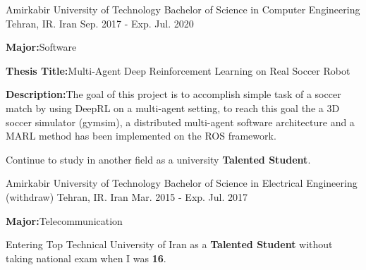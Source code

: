 

\begin{cventries}

  \cventry
    {Amirkabir University of Technology} %
    {Bachelor of Science in Computer Engineering} %
    {Tehran, IR. Iran} %
    {Sep. 2017 - Exp. Jul. 2020} %
    {
      \begin{cvitems} %
        \item {\textbf{Major:}\enskip\enskip\enskip Software}
        \item {\textbf{Thesis Title:}\enskip\enskip\enskip Multi-Agent Deep Reinforcement Learning on Real Soccer Robot}
        \item {\textbf{Description:}\enskip\enskip\enskip The goal of this project is to accomplish simple task of a soccer match by using DeepRL on a multi-agent setting, to reach this goal the a 3D soccer simulator (gymsim), a distributed multi-agent  software architecture and a MARL method has been implemented on the ROS framework.}
        \item {Continue to study in another field as a university \textbf{Talented Student}.}
      \end{cvitems}
    }

  \cventry
    {Amirkabir University of Technology} %
    {Bachelor of Science in Electrical Engineering (withdraw)} %
    {Tehran, IR. Iran} %
    {Mar. 2015 - Exp. Jul. 2017} %
    {
      \begin{cvitems} %
      \item {\textbf{Major:}\enskip\enskip\enskip Telecommunication}
        \item {Entering Top Technical University of Iran as a \textbf{Talented Student} without taking national exam  when I was \textbf{16}.}
      \end{cvitems}
    }

\end{cventries}
